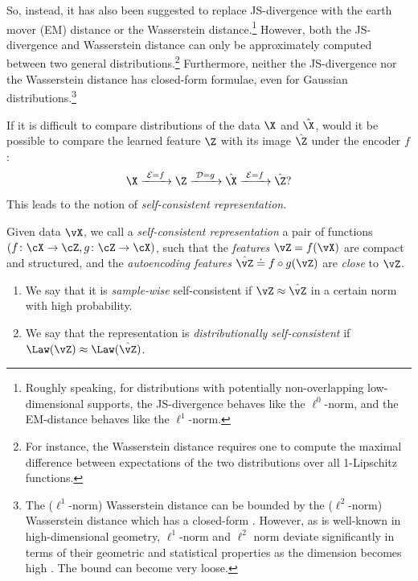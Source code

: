 \documentclass[../../book-main.tex]{subfiles}
\begin{document}
So, instead, it has also been suggested to replace JS-divergence with the earth mover (EM) distance or the Wasserstein distance.\footnote{Roughly speaking, for distributions with potentially non-overlapping low-dimensional supports, the JS-divergence behaves like the $\ell^0$-norm, and the EM-distance behaves like the $\ell^1$-norm.} However, both the JS-divergence and Wasserstein distance can only be approximately computed between two general distributions.\footnote{For instance, the Wasserstein distance requires one to compute the maximal difference between expectations of the two distributions over all 1-Lipschitz functions.} Furthermore, neither the JS-divergence nor the Wasserstein distance has closed-form formulae, even for Gaussian distributions.\footnote{The ($\ell^1$-norm) Wasserstein distance can be bounded by the ($\ell^2$-norm) Wasserstein distance which has a closed-form \cite{salmona2021gromovwasserstein}. However, as is well-known in high-dimensional geometry, $\ell^1$-norm and $\ell^2$ norm deviate significantly in terms of their geometric and statistical properties as the dimension becomes high \cite{Wright-Ma-2022}. The bound can become very loose.} 

If it is difficult to compare distributions of the data $\X$ and $\hat \X$, would it be possible to compare the learned feature $\Z$ with its image $\hat \Z$ under the encoder $f$: 
\begin{equation}
 \X
\xrightarrow{\hspace{1mm} \mathcal{E} = f \hspace{1mm}} \Z  \xrightarrow{\hspace{1mm} \mathcal{D} = g \hspace{1mm}} \hat{\X} \xrightarrow{\hspace{1mm} \mathcal{E} = f \hspace{1mm}} \hat \Z?
\label{eqn:closed-autoencoding}
\end{equation}
This leads to the notion of {\em self-consistent representation}.
\begin{definition}\label{def:closed_loop}
    Given data \(\vX\), we call a \textit{self-consistent representation} a pair of functions \((f \colon \cX \to \cZ, g \colon \cZ \to \cX)\), such that the \textit{features} \(\vZ = f(\vX)\) are compact and structured, and the \textit{autoencoding features} \(\hat{\vZ} \doteq f \circ g(\vZ)\) are \textit{close} to \(\vZ\). 
    \begin{enumerate}
        \item We say that it is \textit{sample-wise} self-consistent if \(\vZ \approx \hat{\vZ}\) in a certain norm with high probability.
        \item We say that the representation is \textit{distributionally self-consistent} if \(\Law(\vZ) \approx \Law(\hat{\vZ})\).
    \end{enumerate}
\end{definition}
\end{document}
